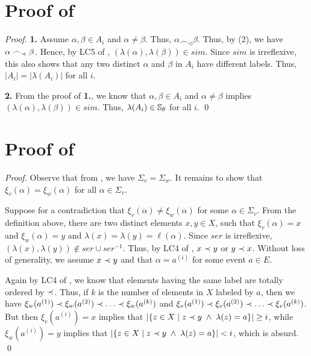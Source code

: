 \documentclass{llncs}
\begin{document}
\section{Proof of }
\begin{proof}\textbf{1. } Assume $\alpha,\beta \in A_i$ and $\alpha\not=\beta$. Thus, $\alpha\frown_{\lhd}\beta$.  Thus, by  (2), we have $\alpha \frown_\prec \beta$. Hence, by \textsf{LC5} of ,  $(\lambda(\alpha),\lambda(\beta))\in sim$. Since $sim$ is irreflexive, this also shows that any two distinct $\alpha$ and $\beta$ in $A_i$ have different labels. Thus, $|A_{i}|=|\lambda(A_{i})|$ for all $i$.

\textbf{2. } From the proof of \textbf{1.}, we know that  $\alpha,\beta \in A_i$ and $\alpha\not=\beta$ implies $(\lambda(\alpha),\lambda(\beta))\in sim$. Thus, $\lambda(A_{i})\in \mathbb{S}_{\theta}$ for all $i$.
\qed
\end{proof}






\section{Proof of }
\begin{proof} Observe that from , we have $\Sigma_{v}=\Sigma_{w}$. It remains to show that  $\xi_{v}(\alpha) = \xi_{w}(\alpha)$ for all $\alpha\in \Sigma_{v}$. 

Suppose for a contradiction that $\xi_{v}(\alpha) \not= \xi_{w}(\alpha)$ for some $\alpha\in \Sigma_{v}$. From the definition above, there are two distinct elements $x,y\in X$, such that $\xi_{v}(\alpha)= x$ and $\xi_{w}(\alpha)= y$ and $\lambda(x)= \lambda(y)=\ell(\alpha)$. Since $ser$ is irreflexive, $(\lambda(x),\lambda(y))\not \in ser \cup ser^{-1}$. Thus, by \textsf{LC4} of , $x\prec y$ or $y \prec x$. Without loss of generality, we assume $x\prec y$ and that $\alpha = a^{(i)}$ for some event $a\in E$. 

Again by \textsf{LC4} of , we know that elements  having the same label are totally ordered by $\prec$. Thus, if $k$ is the number of elements in $X$ labeled by $a$, then we have $\xi_{w}(a^{(1)})\prec \xi_{w}(a^{(2)})\prec \ldots  \prec \xi_{w}(a^{(k)})$ and  $\xi_{v}(a^{(1)})\prec \xi_{v}(a^{(2)})\prec \ldots  \prec \xi_{v}(a^{(k)})$. But then  $\xi_{v}(a^{(i)})= x$ implies that $|\{z\in X\mid z\prec y \;\wedge\;  \lambda(z) = a\}| \ge i$, while $\xi_{w}(a^{(i)})= y$ implies that $|\{z\in X\mid z\prec y \;\wedge\;  \lambda(z) = a\}| < i$, which is absurd. \qed
\end{proof}
\end{document}
